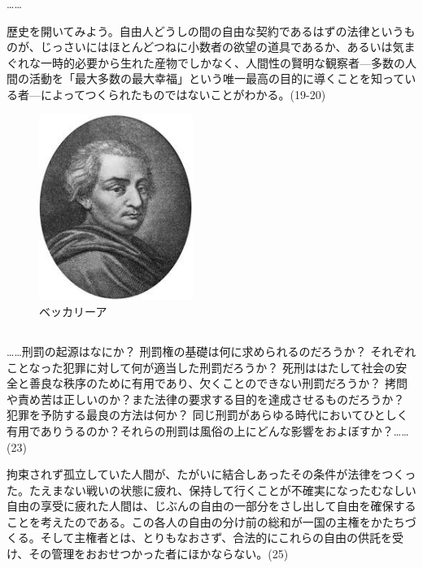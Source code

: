 ……

歴史を開いてみよう。自由人どうしの間の自由な契約であるはずの法律というものが、じっさいにはほとんどつねに小数者の欲望の道具であるか、あるいは気まぐれな一時的必要から生れた産物でしかなく、人間性の賢明な観察者{\——}多数の人間の活動を「最大多数の最大幸福」という唯一最高の目的に導くことを知っている者{\——}によってつくられたものではないことがわかる。(19-20)

 \begin{figure}[htbp]
   \centering
     \includegraphics[width=50mm]{images/beccaria.jpg}
   \caption{ベッカリーア}
 \end{figure}


\subsection{}

……刑罰の起源はなにか？ 刑罰権の基礎は何に求められるのだろうか？ それぞれことなった犯罪に対して何が適当した刑罰だろうか？ 死刑ははたして社会の安全と善良な秩序のために有用であり、欠くことのできない刑罰だろうか？ 拷問や責め苦は正しいのか？また法律の要求する目的を達成させるものだろうか？ 犯罪を予防する最良の方法は何か？ 同じ刑罰があらゆる時代においてひとしく有用でありうるのか？それらの刑罰は風俗の上にどんな影響をおよぼすか？…… (23)

拘束されず孤立していた人間が、たがいに結合しあったその条件が法律をつくった。たえまない戦いの状態に疲れ、保持して行くことが不確実になったむなしい自由の享受に疲れた人間は、じぶんの自由の一部分をさし出して自由を確保することを考えたのである。この各人の自由の分け前の総和が一国の主権をかたちづくる。そして主権者とは、とりもなおさず、合法的にこれらの自由の供託を受け、その管理をおおせつかった者にほかならない。(25)


